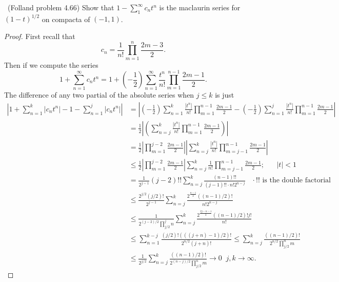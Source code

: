 \documentclass[11pt]{amsart}
\theoremstyle{definition}
\numberwithin{theorem}{section}
\numberwithin{definition}{section}
\numberwithin{equation}{section}
\begin{document}
\medskip {}\ (Folland problem 4.66) Show that $1 - \sum_1^\infty c_nt^n$ is the maclaurin series for $(1-t)^{1/2}$ on compacta of $(-1,1)$. 
\begin{proof}
	First recall that
	\begin{equation*}
		c_n = \frac{1}{n!}\prod_{m=1}^n \frac{2m-3}{2}.
	\end{equation*}
	Then if we compute the series
	\begin{equation*}
		1 + \sum_{n=1}^\infty c_nt^n = 1 + \left(-\frac{1}{2}\right) \sum_{n=1}^\infty \frac{t^n}{n!} \prod_{m=1}^{n-1} \frac{2m - 1}{2}.
	\end{equation*}
	The difference of any two partial of the absolute series when $j \leq k$ is just
	\begin{equation*}
		\begin{aligned}
			\left|1 + \sum_{n=1}^k |c_nt^n|  - 1 - \sum_{n=1}^j |c_nt^n|\right| &=  \left|\left(-\frac{1}{2}\right) \sum_{n=1}^k \frac{|t^n|}{n!} \prod_{m=1}^{n-1} \frac{2m - 1}{2} - \left(-\frac{1}{2}\right) \sum_{n=1}^j \frac{|t^n|}{n!} \prod_{m=1}^{n-1} \frac{2m - 1}{2}\right| \\
			&= \frac{1}{2}\left|\left(\sum_{n=j}^k \frac{|t^n|}{n!} \prod_{m=1}^{n-1} \frac{2m - 1}{2} \right)\right| \\
			& = \frac{1}{2} \left|\prod_{m=1}^{j-2} \frac{2m - 1}{2}  \right|\left|\sum_{n=j}^k \frac{|t^n|}{n!} \prod_{m=j-1}^{n-1} \frac{2m - 1}{2} \right| \\
			&\leq  \frac{1}{2} \left|\prod_{m=1}^{j-2} \frac{2m - 1}{2}  \right|\sum_{n=j}^k \frac{1}{n!} \prod_{m=j-1}^{n-1} \frac{2m - 1}{2};\;\;\;\;\;\;|t| < 1 \\
			&=  \frac{1}{{2^{j-1}}} (j-2)!! \sum_{n=j}^k \frac{(n-1)!!}{(j-1)!!\cdot n!2^{n-j}}\;\;\;\cdot !!\text{ is the double factorial}\\ 
			&\leq  \frac{2^{j/2} (j/2)! }{{2^{j-1}}} \sum_{n=j}^k \frac{2^{\frac{n-1}{2}} ((n-1)/2)!}{n!2^{n-j}} \\
			&\leq  \frac{ 1 }{{2^{(j-2)/2}} \prod_{j/2}^{j} n} \sum_{n=j}^k \frac{2^{\frac{2j-n-1}{2}} ((n-1)/2)!j!}{n!} \\
			&\leq \sum_{n=1}^{k-j} \frac{(j/2)!(((j+n)-1)/2)!}{ 2^{n/2}(j+n)!} \leq \sum_{n=j}^{k} \frac{((n-1)/2)!}{ 2^{n/2}\prod_{j/2}^{n}{m}}  \\
			&\leq \frac{1}{2^{j/2}} \sum_{n=j}^{k} \frac{((n-1)/2)!}{ 2^{(n-j)/2}\prod_{j/2}^{n}{m}} \to 0\;\; j,k \to \infty.
		\end{aligned}
	\end{equation*}

\end{proof}
\end{document}
